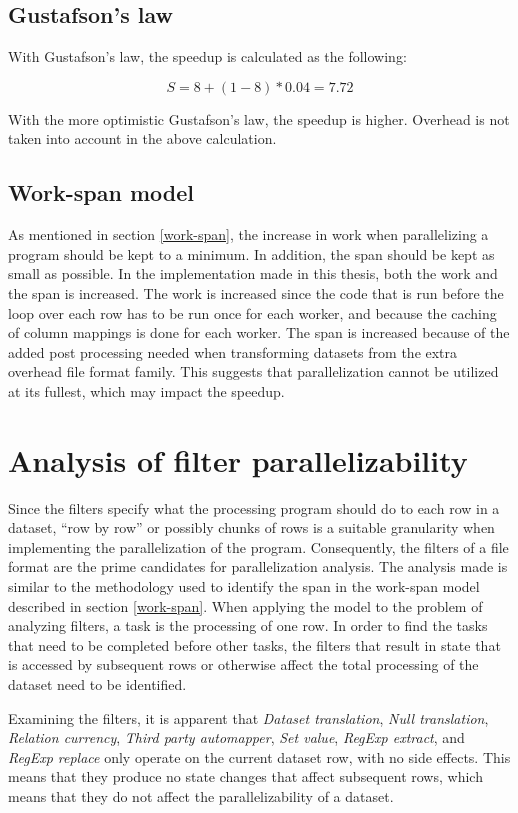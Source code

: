 \subsection{Gustafson's law}
With Gustafson's law, the speedup is calculated as the following:

\begin{displaymath}
  S = 8 + (1-8) * 0.04 = 7.72
\end{displaymath}

\noindent With the more optimistic Gustafson's law, the speedup is higher. Overhead is not taken into account in the above calculation.

\subsection{Work-span model}
As mentioned in section \ref{work-span}, the increase in work when parallelizing a program should be kept to a minimum.
In addition, the span should be kept as small as possible. In the implementation made in this thesis, both the work and the span is increased.
The work is increased since the code that is run before the loop over each row has to be run once for each worker, and because the caching of
column mappings is done for each worker. The span is increased because of the added post processing needed when transforming datasets from the
extra overhead file format family. This suggests that parallelization cannot be utilized at its fullest, which may impact the speedup.

\section{Analysis of filter parallelizability}
Since the filters specify what the processing program should do to each row in a dataset, ``row by row'' or possibly chunks of rows is a suitable
granularity when implementing the parallelization of the program. Consequently, the filters of a file format are the prime candidates
for parallelization analysis. The analysis made is similar to the methodology used to identify the span in the work-span model described in
section \ref{work-span}. When applying the model to the problem of analyzing filters, a task is the processing of one row. In order to find
the tasks that need to be completed before other tasks, the filters that result in state that is accessed by subsequent rows or otherwise
affect the total processing of the dataset need to be identified.

Examining the filters, it is apparent that \textit{Dataset translation}, \textit{Null translation}, \textit{Relation currency},
\textit{Third party automapper}, \textit{Set value}, \textit{RegExp extract}, and \textit{RegExp replace} only operate on the current dataset row, with no side effects.
This means that they produce no state changes that affect subsequent rows, which means that they do not affect the parallelizability of a dataset.

